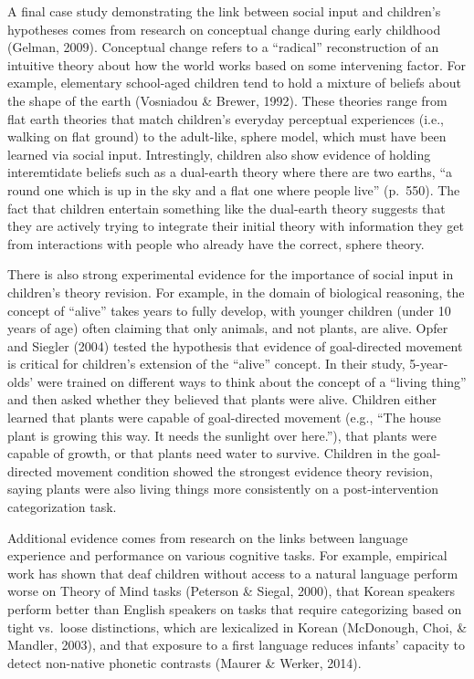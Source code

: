 \documentclass[english,floatsintext,man]{apa6}
\theoremstyle{definition}
\theoremstyle{definition}
\theoremstyle{definition}
\theoremstyle{remark}
\begin{document}
A final case study demonstrating the link between social input and
children's hypotheses comes from research on conceptual change during
early childhood (Gelman, 2009). Conceptual change refers to a
\enquote{radical} reconstruction of an intuitive theory about how the
world works based on some intervening factor. For example, elementary
school-aged children tend to hold a mixture of beliefs about the shape
of the earth (Vosniadou \& Brewer, 1992). These theories range from flat
earth theories that match children's everyday perceptual experiences
(i.e., walking on flat ground) to the adult-like, sphere model, which
must have been learned via social input. Intrestingly, children also
show evidence of holding interemtidate beliefs such as a dual-earth
theory where there are two earths, \enquote{a round one which is up in
the sky and a flat one where people live} (p.~550). The fact that
children entertain something like the dual-earth theory suggests that
they are actively trying to integrate their initial theory with
information they get from interactions with people who already have the
correct, sphere theory.

There is also strong experimental evidence for the importance of social
input in children's theory revision. For example, in the domain of
biological reasoning, the concept of \enquote{alive} takes years to
fully develop, with younger children (under 10 years of age) often
claiming that only animals, and not plants, are alive. Opfer and Siegler
(2004) tested the hypothesis that evidence of goal-directed movement is
critical for children's extension of the \enquote{alive} concept. In
their study, 5-year-olds' were trained on different ways to think about
the concept of a \enquote{living thing} and then asked whether they
believed that plants were alive. Children either learned that plants
were capable of goal-directed movement (e.g., \enquote{The house plant
is growing this way. It needs the sunlight over here.}), that plants
were capable of growth, or that plants need water to survive. Children
in the goal-directed movement condition showed the strongest evidence
theory revision, saying plants were also living things more consistently
on a post-intervention categorization task.

Additional evidence comes from research on the links between language
experience and performance on various cognitive tasks. For example,
empirical work has shown that deaf children without access to a natural
language perform worse on Theory of Mind tasks (Peterson \& Siegal,
2000), that Korean speakers perform better than English speakers on
tasks that require categorizing based on tight vs.~loose distinctions,
which are lexicalized in Korean (McDonough, Choi, \& Mandler, 2003), and
that exposure to a first language reduces infants' capacity to detect
non-native phonetic contrasts (Maurer \& Werker, 2014).
\end{document}

